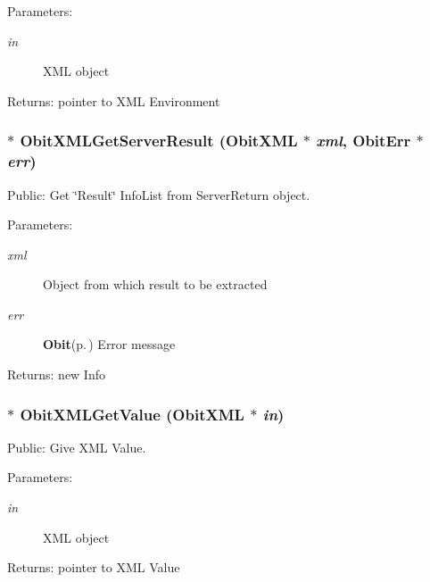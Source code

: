 \begin{Desc}
\item[Parameters:]
\begin{description}
\item[{\em in}]XML object \end{description}
\end{Desc}
\begin{Desc}
\item[Returns:]pointer to XML Environment \end{Desc}
\subsubsection{$\ast$ Obit\-XMLGet\-Server\-Result ({\bf Obit\-XML} $\ast$ {\em xml}, {\bf Obit\-Err} $\ast$ {\em err})}\label{ObitXML_8c_a27}


Public: Get \char`\"{}Result\char`\"{} Info\-List from Server\-Return object. 

\begin{Desc}
\item[Parameters:]
\begin{description}
\item[{\em xml}]Object from which result to be extracted \item[{\em err}]{\bf Obit}{\rm (p.\,\pageref{structObit})} Error message \end{description}
\end{Desc}
\begin{Desc}
\item[Returns:]new Info \end{Desc}
\subsubsection{$\ast$ Obit\-XMLGet\-Value ({\bf Obit\-XML} $\ast$ {\em in})}\label{ObitXML_8c_a13}


Public: Give XML Value. 

\begin{Desc}
\item[Parameters:]
\begin{description}
\item[{\em in}]XML object \end{description}
\end{Desc}
\begin{Desc}
\item[Returns:]pointer to XML Value \end{Desc}
